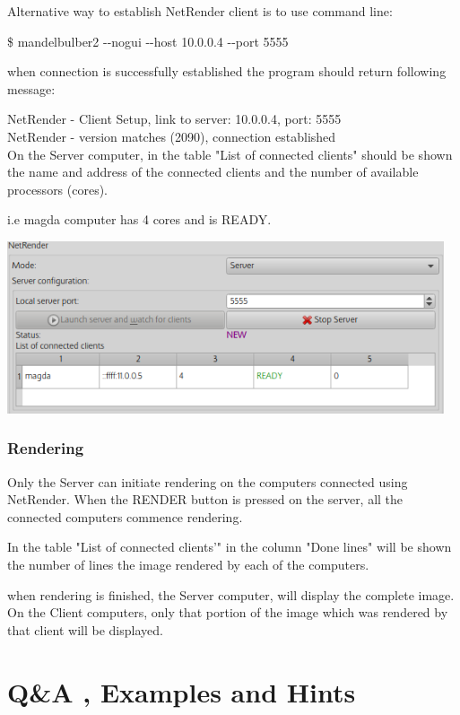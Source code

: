 Alternative way to establish NetRender client is to use command line:

\$ mandelbulber2 -\/-nogui -\/-host 10.0.0.4 -\/-port 5555

when connection is successfully established the program should return
following message:

NetRender - Client Setup, link to server: 10.0.0.4, port: 5555\\
NetRender - version matches (2090), connection
established\\[2\baselineskip]On the Server computer, in the table "List
of connected clients" should be shown the name and address of the
connected clients and the number of available processors (cores).

i.e magda computer has 4 cores and is READY.

\includegraphics[width=5.07283in,height=1.99843in]{img/manual/media/image32.png}

\subsubsection{Rendering}\label{rendering}

Only the Server can initiate rendering on the computers connected using
NetRender. When the RENDER button is pressed on the server, all the
connected computers commence rendering.

In the table "List of connected clients'" in the column "Done lines"
will be shown the number of lines the image rendered by each of the
computers.

when rendering is finished, the Server computer, will display the
complete image. On the Client computers, only that portion of the image
which was rendered by that client will be displayed.

\hypertarget{qa-examples-and-hints}{\section{Q\&A , Examples and
Hints}\label{qa-examples-and-hints}}

